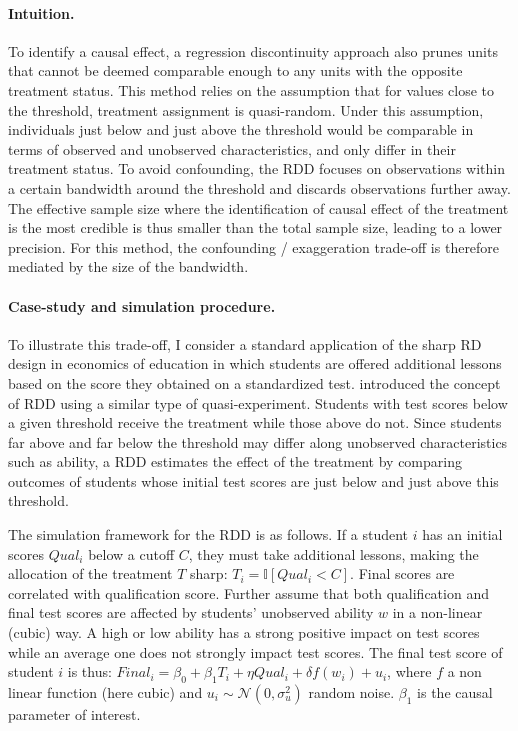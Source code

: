 \documentclass[usletter, 12pt]{article}
\begin{document}
     			\paragraph{Intuition.} To identify a causal effect, a regression discontinuity approach also prunes units that cannot be deemed comparable enough to any units with the opposite treatment status. This method relies on the assumption that for values close to the threshold, treatment assignment is quasi-random. Under this assumption, individuals just below and just above the threshold would be comparable in terms of observed and unobserved characteristics, and only differ in their treatment status. To avoid confounding, the RDD focuses on observations within a certain bandwidth around the threshold and discards observations further away. The effective sample size where the identification of causal effect of the treatment is the most credible is thus smaller than the total sample size, leading to a lower precision. For this method, the confounding / exaggeration trade-off is therefore mediated by the size of the bandwidth.
			
			\paragraph{Case-study and simulation procedure.} To illustrate this trade-off, I consider a standard application of the sharp RD design in economics of education in which students are offered additional lessons based on the score they obtained on a standardized test. \cite{thistlethwaite_regression-discontinuity_1960} introduced the concept of RDD using a similar type of quasi-experiment. Students with test scores below a given threshold receive the treatment while those above do not. Since students far above and far below the threshold may differ along unobserved characteristics such as ability, a RDD estimates the effect of the treatment by comparing outcomes of students whose initial test scores are just below and just above this threshold. 
        
        			 The simulation framework for the RDD is as follows. If a student $i$ has an initial scores $Qual_{i}$ below a cutoff $C$, they must take additional lessons, making the allocation of the treatment $T$ sharp: $T_i = \mathbb{I}[Qual_{i} < C]$. Final scores are correlated with qualification score. Further assume that both qualification and final test scores are affected by students' unobserved ability $w$ in a non-linear (cubic) way. A high or low ability has a strong positive impact on test scores while an average one does not strongly impact test scores. The final test score of student $i$ is thus: $Final_{i} = \beta_{0} + \beta_{1} T_i + \eta Qual_{i} +  \delta f(w_i) + u_{i}$, where $f$ a non linear function (here cubic) and $u_{i} \sim \mathcal{N}(0, \sigma_{u}^{2})$ random noise. $\beta_{1}$ is the causal parameter of interest. 
        
\end{document}
